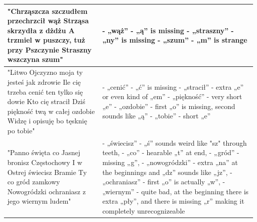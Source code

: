 \documentclass[12pt,a4paper,english]{article}
\begin{document}
\begin{center}
\begin{tabular}{| p{8cm} | p{8cm} |}
"Chrząszcza szczudłem przechrzcił wąż Strząsa skrzydła z dżdżu A trzmiel w puszczy, tuż przy Pszczynie Straszny wszczyna szum" &
- „wąż” - „ą” is missing \newline
- „straszny” - „ny” is missing \newline
- „szum” - „m” is strange
\\ \hline
"Litwo Ojczyzno moja ty jesteś jak zdrowie Ile cię trzeba cenić ten tylko się dowie Kto cię stracił Dziś piękność twą w całej ozdobie Widzę i opisuję bo tęsknię po tobie" &
- „cenić” - „ć” is missing \newline
- „stracił” - extra „e” or even kind of „em” \newline
- „piękność” - very short „e” \newline
- „ozdobie” - first „o” is missing, second sounds like „ą” \newline
- „tobie” - short „e”
\\ \hline
"Panno święta co Jasnej bronisz Częstochowy I w Ostrej świecisz Bramie Ty co gród zamkowy Nowogródzki ochraniasz z jego wiernym ludem" &
- „świecisz” - „ś” sounds weird like "sz" through teeth, \newline
- „co” - hearable „t” at end, \newline
- „gród” - missing „g”, \newline
- „nowogródzki” - extra „na” at the beginnings and „dz” sounds like „jz”, \newline
- „ochraniasz” - first „o” is actually „w”, \newline
- „wiernym” - quite bad, at the beginning there is extra „pły”, and there is missing „r” making it completely unrecognizeable
\\ \hline
\end{tabular}
\end{center}

\newpage
\end{document}
